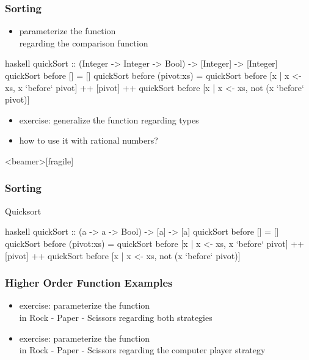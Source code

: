 \documentclass[dvipsnames]{beamer}
\theoremstyle{plain}
\begin{document}
\begin{frame}[fragile]
  \frametitle{Sorting}

  \begin{itemize}
    \item parameterize the  function\\
      regarding the comparison function
  \end{itemize}

  \begin{exampleblock}{}
    \begin{pygments}{haskell}
quickSort :: (Integer -> Integer -> Bool)
                 -> [Integer] -> [Integer]
quickSort before [] = []
quickSort before (pivot:xs) =
    quickSort before [x | x <- xs, x `before` pivot]
    ++ [pivot]
    ++ quickSort before [x | x <- xs,
                             not (x `before` pivot)]
    \end{pygments}
  \end{exampleblock}

  \pause
  \begin{itemize}
    \item exercise: generalize the function regarding types
    \item how to use it with rational numbers?
  \end{itemize}
\end{frame}

\begin{frame}<beamer>[fragile]
  \frametitle{Sorting}

  \begin{exampleblock}{Quicksort}
    \begin{pygments}{haskell}
quickSort :: (a -> a -> Bool) -> [a] -> [a]
quickSort before [] = []
quickSort before (pivot:xs) =
    quickSort before [x | x <- xs, x `before` pivot]
    ++ [pivot]
    ++ quickSort before [x | x <- xs,
                             not (x `before` pivot)]
    \end{pygments}
  \end{exampleblock}
\end{frame}

\begin{frame}
  \frametitle{Higher Order Function Examples}

  \begin{itemize}
    \item exercise: parameterize the  function\\
      in Rock - Paper - Scissors regarding both strategies
    \item exercise: parameterize the  function\\
      in Rock - Paper - Scissors regarding the computer player strategy
  \end{itemize}
\end{frame}
\end{document}
